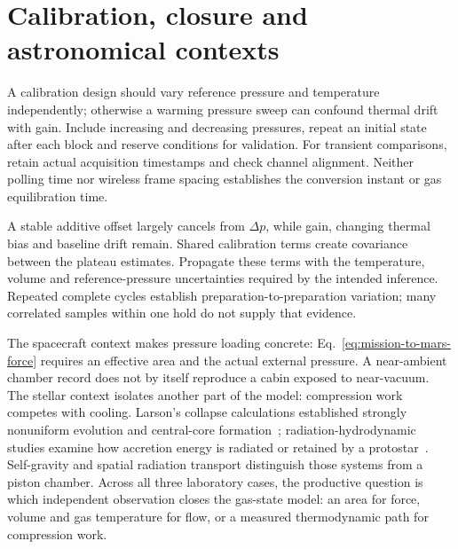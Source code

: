\section{Calibration, closure and astronomical contexts}
A calibration design should vary reference pressure and temperature independently; otherwise a warming pressure sweep can confound thermal drift with gain. Include increasing and decreasing pressures, repeat an initial state after each block and reserve conditions for validation. For transient comparisons, retain actual acquisition timestamps and check channel alignment. Neither polling time nor wireless frame spacing establishes the conversion instant or gas equilibration time.

A stable additive offset largely cancels from $\Delta p$, while gain, changing thermal bias and baseline drift remain. Shared calibration terms create covariance between the plateau estimates. Propagate these terms with the temperature, volume and reference-pressure uncertainties required by the intended inference. Repeated complete cycles establish preparation-to-preparation variation; many correlated samples within one hold do not supply that evidence.

The spacecraft context makes pressure loading concrete: Eq.~\eqref{eq:mission-to-mars-force} requires an effective area and the actual external pressure. A near-ambient chamber record does not by itself reproduce a cabin exposed to near-vacuum. The stellar context isolates another part of the model: compression work competes with cooling. Larson's collapse calculations established strongly nonuniform evolution and central-core formation~\cite{larson1969}; radiation-hydrodynamic studies examine how accretion energy is radiated or retained by a protostar~\cite{bhandare2025}. Self-gravity and spatial radiation transport distinguish those systems from a piston chamber. Across all three laboratory cases, the productive question is which independent observation closes the gas-state model: an area for force, volume and gas temperature for flow, or a measured thermodynamic path for compression work.
